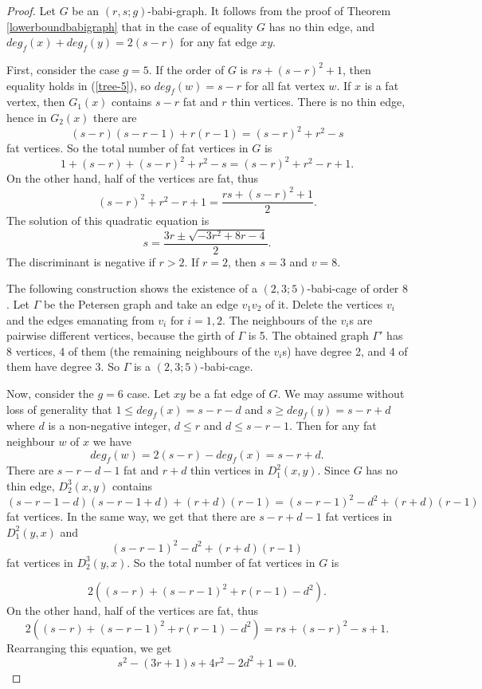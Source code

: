 \documentclass[10pt,a4paper]{amsart}
\begin{document}
\begin{proof}
Let $G$ be an $(r,s;g)$-babi-graph. 
It follows from the proof of Theorem \ref{lowerboundbabigraph} that in the case of equality
$G$ has no thin edge, and $deg_f(x)+deg_f(y)=2(s-r)$ for any fat edge $xy$. 

First, consider the case $g=5$. If the order of $G$ is $rs+(s-r)^2+1$, then equality holds in 
(\ref{tree-5}), so $deg_f(w)=s-r$ for all fat vertex $w$. If $x$ is a fat vertex, then $G_1(x)$
contains $s-r$ fat and $r$ thin vertices. There is no thin edge, hence in $G_2(x)$ there are 
$$(s-r)(s-r-1)+r(r-1)=(s-r)^2+r^2-s$$
fat vertices. So the total number of fat vertices in $G$ is 
$$1+(s-r)+(s-r)^2+r^2-s=(s-r)^2+r^2-r+1.$$
On the other hand, half of the vertices are fat, thus
$$(s-r)^2+r^2-r+1=\frac{rs+(s-r)^2+1}{2}.$$
The solution of this quadratic equation is
$$s=\frac{3r\pm \sqrt{-3r^2+8r-4}}{2}.$$
The discriminant is negative if $r>2.$ If $r=2$, then $s=3$ and $v=8$.

The following construction shows the existence of a $(2,3;5)$-babi-cage of order $8$.
Let $\Gamma$ be the Petersen graph and take an edge $v_1v_2$ of it. Delete the vertices $v_i$ and the edges emanating from $v_i$ for $i=1,2.$ The neighbours of
the $v_i$s are pairwise different vertices, because the girth of $\Gamma $ is 5. 
The obtained graph $\Gamma '$ has 8 vertices, 4 of them (the
remaining neighbours of the $v_i$s) have degree 2, and 4 of them have degree 3.
So $\Gamma $ is a $(2,3;5)$-babi-cage.

\smallskip
Now, consider the $g=6$ case. Let $xy$ be a fat edge of $G$. We may assume without loss of generality
that $1\leq deg_f(x)=s-r-d$ and $s\geq deg_f(y)=s-r+d$ where $d$ is a non-negative integer, $d\leq r$ and $d\leq s-r-1$. Then for any fat neighbour $w$ of $x$ we have 
$$deg_f(w)=2(s-r)-deg_f(x)=s-r+d.$$
There are $s-r-d-1$ fat and $r+d$ thin vertices in $D_1^2(x,y)$. Since $G$ has no thin edge,
$D_2^3(x,y)$ contains
 $$(s-r-1-d)(s-r-1+d)+(r+d)(r-1)=(s-r-1)^2-d^2+(r+d)(r-1)$$
fat vertices. In the same way, we get that there are $s-r+d-1$ fat vertices in $D_1^2(y,x)$ and 
$$(s-r-1)^2-d^2+(r+d)(r-1)$$ 
fat vertices in $D_2^3(y,x)$. So the total number of fat vertices in $G$ is

$$2\left( (s-r)+(s-r-1)^2+r(r-1)-d^2 \right).$$
On the other hand, half of the vertices are fat, thus
$$2\left( (s-r)+(s-r-1)^2+r(r-1)-d^2 \right)=rs+(s-r)^2-s+1.$$
Rearranging this equation, we get
\begin{equation}
\label{diophantine}
s^2-(3r+1)s+4r^2-2d^2+1=0.
\end{equation}


\end{proof}
\end{document}
